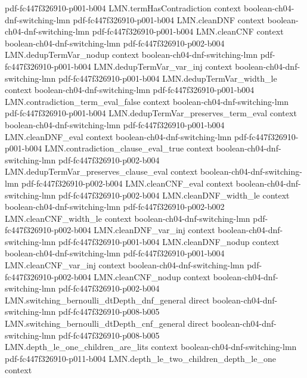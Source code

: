 \begin{theorem}
  {pdf-fc447f326910-p001-b004}
\proofstep
  {LMN.termHasContradiction}
  {context}
  {boolean-ch04-dnf-switching-lmn}
  {pdf-fc447f326910-p001-b004}
\proofstep
  {LMN.cleanDNF}
  {context}
  {boolean-ch04-dnf-switching-lmn}
  {pdf-fc447f326910-p001-b004}
\proofstep
  {LMN.cleanCNF}
  {context}
  {boolean-ch04-dnf-switching-lmn}
  {pdf-fc447f326910-p002-b004}
\proofstep
  {LMN.dedupTermVar_nodup}
  {context}
  {boolean-ch04-dnf-switching-lmn}
  {pdf-fc447f326910-p001-b004}
\proofstep
  {LMN.dedupTermVar_var_inj}
  {context}
  {boolean-ch04-dnf-switching-lmn}
  {pdf-fc447f326910-p001-b004}
\proofstep
  {LMN.dedupTermVar_width_le}
  {context}
  {boolean-ch04-dnf-switching-lmn}
  {pdf-fc447f326910-p001-b004}
\proofstep
  {LMN.contradiction_term_eval_false}
  {context}
  {boolean-ch04-dnf-switching-lmn}
  {pdf-fc447f326910-p001-b004}
\proofstep
  {LMN.dedupTermVar_preserves_term_eval}
  {context}
  {boolean-ch04-dnf-switching-lmn}
  {pdf-fc447f326910-p001-b004}
\proofstep
  {LMN.cleanDNF_eval}
  {context}
  {boolean-ch04-dnf-switching-lmn}
  {pdf-fc447f326910-p001-b004}
\proofstep
  {LMN.contradiction_clause_eval_true}
  {context}
  {boolean-ch04-dnf-switching-lmn}
  {pdf-fc447f326910-p002-b004}
\proofstep
  {LMN.dedupTermVar_preserves_clause_eval}
  {context}
  {boolean-ch04-dnf-switching-lmn}
  {pdf-fc447f326910-p002-b004}
\proofstep
  {LMN.cleanCNF_eval}
  {context}
  {boolean-ch04-dnf-switching-lmn}
  {pdf-fc447f326910-p002-b004}
\proofstep
  {LMN.cleanDNF_width_le}
  {context}
  {boolean-ch04-dnf-switching-lmn}
  {pdf-fc447f326910-p002-b002}
\proofstep
  {LMN.cleanCNF_width_le}
  {context}
  {boolean-ch04-dnf-switching-lmn}
  {pdf-fc447f326910-p002-b004}
\proofstep
  {LMN.cleanDNF_var_inj}
  {context}
  {boolean-ch04-dnf-switching-lmn}
  {pdf-fc447f326910-p001-b004}
\proofstep
  {LMN.cleanDNF_nodup}
  {context}
  {boolean-ch04-dnf-switching-lmn}
  {pdf-fc447f326910-p001-b004}
\proofstep
  {LMN.cleanCNF_var_inj}
  {context}
  {boolean-ch04-dnf-switching-lmn}
  {pdf-fc447f326910-p002-b004}
\proofstep
  {LMN.cleanCNF_nodup}
  {context}
  {boolean-ch04-dnf-switching-lmn}
  {pdf-fc447f326910-p002-b004}
\proofstep
  {LMN.switching_bernoulli_dtDepth_dnf_general}
  {direct}
  {boolean-ch04-dnf-switching-lmn}
  {pdf-fc447f326910-p008-b005}
\proofstep
  {LMN.switching_bernoulli_dtDepth_cnf_general}
  {direct}
  {boolean-ch04-dnf-switching-lmn}
  {pdf-fc447f326910-p008-b005}
\proofstep
  {LMN.depth_le_one_children_are_lits}
  {context}
  {boolean-ch04-dnf-switching-lmn}
  {pdf-fc447f326910-p011-b004}
\proofstep
  {LMN.depth_le_two_children_depth_le_one}
  {context}

\end{theorem}
